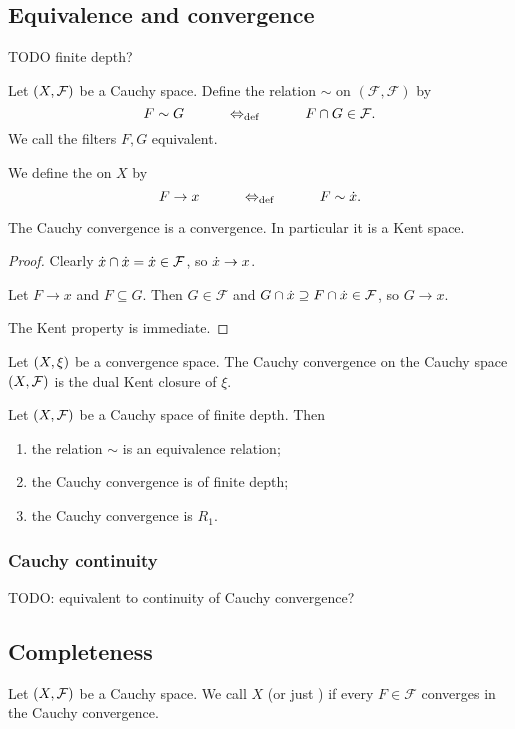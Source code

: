 \subsection{Equivalence and convergence}
TODO finite depth?
\begin{definition}
Let $\left( X, \mathcal{F} \right)$ be a Cauchy space. Define the relation $\sim$ on $(\mathcal{F},\mathcal{F})$ by
\[ F \sim G \qquad \quad\Leftrightarrow_{\text{def}}\quad \qquad F\cap G \in \mathcal{F}. \]
We call the filters $F,G$ equivalent.

We define the  on $X$ by
\[ F \to x \qquad \quad\Leftrightarrow_{\text{def}}\quad \qquad F \sim \dot{x}. \]
\end{definition}

\begin{lemma}
The Cauchy convergence is a convergence. In particular it is a Kent space.
\end{lemma}
\begin{proof}
Clearly $\dot{x}\cap\dot{x} = \dot{x} \in \mathcal{F}$, so $\dot{x} \to x$.

Let $F\to x$ and $F\subseteq G$. Then $G\in \mathcal{F}$ and $G\cap \dot{x} \supseteq F \cap\dot{x} \in \mathcal{F}$, so $G \to x$.

The Kent property is immediate.
\end{proof}

\begin{lemma}
Let $\left( X,\xi \right)$ be a convergence space. The Cauchy convergence on the Cauchy space $\left( X,\mathcal{F} \right)$ is the dual Kent closure of $\xi$.
\end{lemma}

\begin{proposition}
Let $\left( X, \mathcal{F} \right)$ be a Cauchy space of finite depth. Then
\begin{enumerate}
\item the relation $\sim$ is an equivalence relation;
\item the Cauchy convergence is of finite depth;
\item the Cauchy convergence is $R_1$.
\end{enumerate}
\end{proposition}

\subsubsection{Cauchy continuity}
TODO: equivalent to continuity of Cauchy convergence?

\subsection{Completeness}
\begin{definition}
Let $\left( X, \mathcal{F} \right)$ be a Cauchy space. We call $X$  (or just ) if every $F\in \mathcal{F}$ converges in the Cauchy convergence.
\end{definition}

